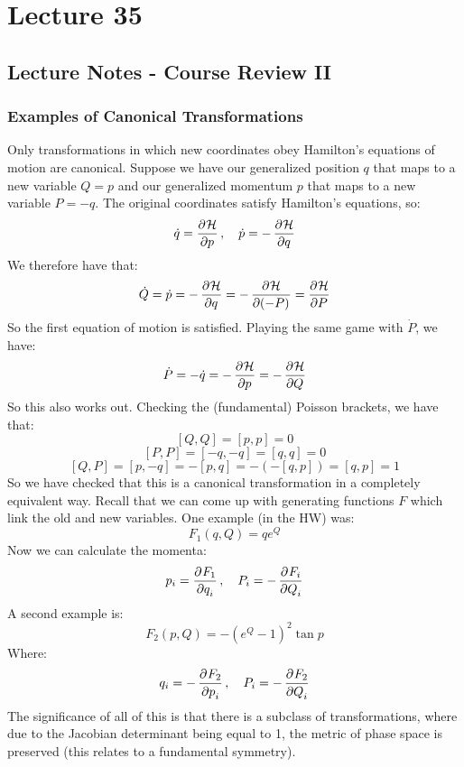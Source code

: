 \section{Lecture 35}
\subsection{Lecture Notes - Course Review II}
\subsubsection{Examples of Canonical Transformations}
Only transformations in which new coordinates obey Hamilton's equations of motion are canonical. Suppose we have our generalized position $q$ that maps to a new variable $Q = p$ and our generalized momentum $p$ that maps to a new variable $P = -q$. The original coordinates satisfy Hamilton's equations, so:
\[\dot{q} = \dpd{\HH}{p}, \quad \dot{p} = -\dpd{\HH}{q}\]
We therefore have that:
\[\dot{Q} = \dot{p} = -\dpd{\HH}{q} = -\dpd{\HH}{(-P)} = \dpd{\HH}{P}\]
So the first equation of motion is satisfied. Playing the same game with $\dot{P}$, we have:
\[\dot{P} = -\dot{q} = -\dpd{\HH}{p} = -\dpd{\HH}{Q}\]
So this also works out. Checking the (fundamental) Poisson brackets, we have that:
\[[Q, Q] = [p, p] = 0\]
\[[P, P] = [-q, -q] = [q, q] = 0\]
\[[Q, P] = [p, -q] = -[p, q] = -(-[q, p]) = [q, p] = 1\]
So we have checked that this is a canonical transformation in a completely equivalent way. Recall that we can come up with generating functions $F$ which link the old and new variables. One example (in the HW) was:
\[F_1(q, Q) = qe^Q\]
Now we can calculate the momenta:
\[p_i = \dpd{F_1}{q_i}, \quad P_i = -\dpd{F_i}{Q_i}\]
A second example is:
\[F_2(p, Q) = -(e^Q - 1)^2\tan p\]
Where:
\[q_i = -\dpd{F_2}{p_i}, \quad P_i = -\dpd{F_2}{Q_i}\]
The significance of all of this is that there is a subclass of transformations, where due to the Jacobian determinant being equal to 1, the metric of phase space is preserved (this relates to a fundamental symmetry). 

